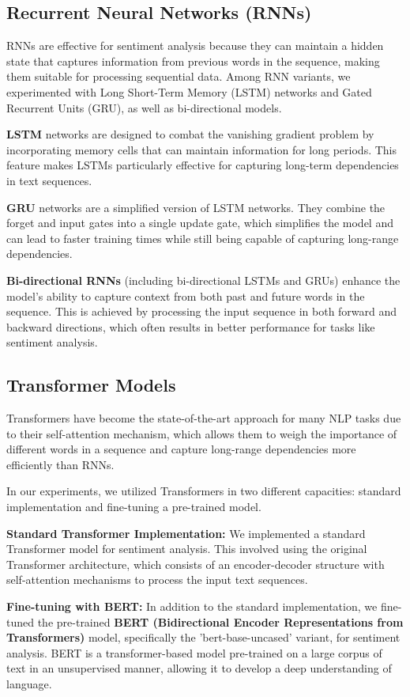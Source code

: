 \documentclass{article}
\begin{document}
\subsection{Recurrent Neural Networks (RNNs)}
RNNs are effective for sentiment analysis because they can maintain a hidden state that captures information from previous words in the sequence, making them suitable for processing sequential data. Among RNN variants, we experimented with Long Short-Term Memory (LSTM) networks and Gated Recurrent Units (GRU), as well as bi-directional models.

\textbf{LSTM} networks are designed to combat the vanishing gradient problem by incorporating memory cells that can maintain information for long periods. This feature makes LSTMs particularly effective for capturing long-term dependencies in text sequences.

\textbf{GRU} networks are a simplified version of LSTM networks. They combine the forget and input gates into a single update gate, which simplifies the model and can lead to faster training times while still being capable of capturing long-range dependencies.

\textbf{Bi-directional RNNs} (including bi-directional LSTMs and GRUs) enhance the model's ability to capture context from both past and future words in the sequence. This is achieved by processing the input sequence in both forward and backward directions, which often results in better performance for tasks like sentiment analysis.

\subsection{Transformer Models}
Transformers have become the state-of-the-art approach for many NLP tasks due to their self-attention mechanism, which allows them to weigh the importance of different words in a sequence and capture long-range dependencies more efficiently than RNNs.

In our experiments, we utilized Transformers in two different capacities: standard implementation and fine-tuning a pre-trained model.

\textbf{Standard Transformer Implementation:} 
We implemented a standard Transformer model for sentiment analysis. This involved using the original Transformer architecture, which consists of an encoder-decoder structure with self-attention mechanisms to process the input text sequences.

\textbf{Fine-tuning with BERT:}
In addition to the standard implementation, we fine-tuned the pre-trained \textbf{BERT (Bidirectional Encoder Representations from Transformers)} model, specifically the 'bert-base-uncased' variant, for sentiment analysis. BERT is a transformer-based model pre-trained on a large corpus of text in an unsupervised manner, allowing it to develop a deep understanding of language.
\end{document}
